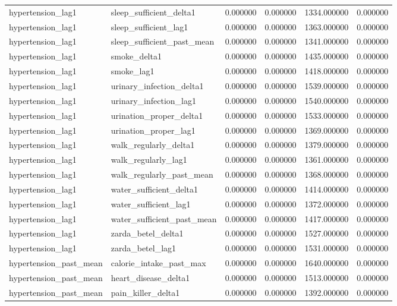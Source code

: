 \begin{longtable}{llrrrr}
hypertension\_lag1 & sleep\_sufficient\_delta1 & 0.000000 & 0.000000 & 1334.000000 & 0.000000 \\
hypertension\_lag1 & sleep\_sufficient\_lag1 & 0.000000 & 0.000000 & 1363.000000 & 0.000000 \\
hypertension\_lag1 & sleep\_sufficient\_past\_mean & 0.000000 & 0.000000 & 1341.000000 & 0.000000 \\
hypertension\_lag1 & smoke\_delta1 & 0.000000 & 0.000000 & 1435.000000 & 0.000000 \\
hypertension\_lag1 & smoke\_lag1 & 0.000000 & 0.000000 & 1418.000000 & 0.000000 \\
hypertension\_lag1 & urinary\_infection\_delta1 & 0.000000 & 0.000000 & 1539.000000 & 0.000000 \\
hypertension\_lag1 & urinary\_infection\_lag1 & 0.000000 & 0.000000 & 1540.000000 & 0.000000 \\
hypertension\_lag1 & urination\_proper\_delta1 & 0.000000 & 0.000000 & 1533.000000 & 0.000000 \\
hypertension\_lag1 & urination\_proper\_lag1 & 0.000000 & 0.000000 & 1369.000000 & 0.000000 \\
hypertension\_lag1 & walk\_regularly\_delta1 & 0.000000 & 0.000000 & 1379.000000 & 0.000000 \\
hypertension\_lag1 & walk\_regularly\_lag1 & 0.000000 & 0.000000 & 1361.000000 & 0.000000 \\
hypertension\_lag1 & walk\_regularly\_past\_mean & 0.000000 & 0.000000 & 1368.000000 & 0.000000 \\
hypertension\_lag1 & water\_sufficient\_delta1 & 0.000000 & 0.000000 & 1414.000000 & 0.000000 \\
hypertension\_lag1 & water\_sufficient\_lag1 & 0.000000 & 0.000000 & 1372.000000 & 0.000000 \\
hypertension\_lag1 & water\_sufficient\_past\_mean & 0.000000 & 0.000000 & 1417.000000 & 0.000000 \\
hypertension\_lag1 & zarda\_betel\_delta1 & 0.000000 & 0.000000 & 1527.000000 & 0.000000 \\
hypertension\_lag1 & zarda\_betel\_lag1 & 0.000000 & 0.000000 & 1531.000000 & 0.000000 \\
hypertension\_past\_mean & calorie\_intake\_past\_max & 0.000000 & 0.000000 & 1640.000000 & 0.000000 \\
hypertension\_past\_mean & heart\_disease\_delta1 & 0.000000 & 0.000000 & 1513.000000 & 0.000000 \\
hypertension\_past\_mean & pain\_killer\_delta1 & 0.000000 & 0.000000 & 1392.000000 & 0.000000 \\

\end{longtable}
